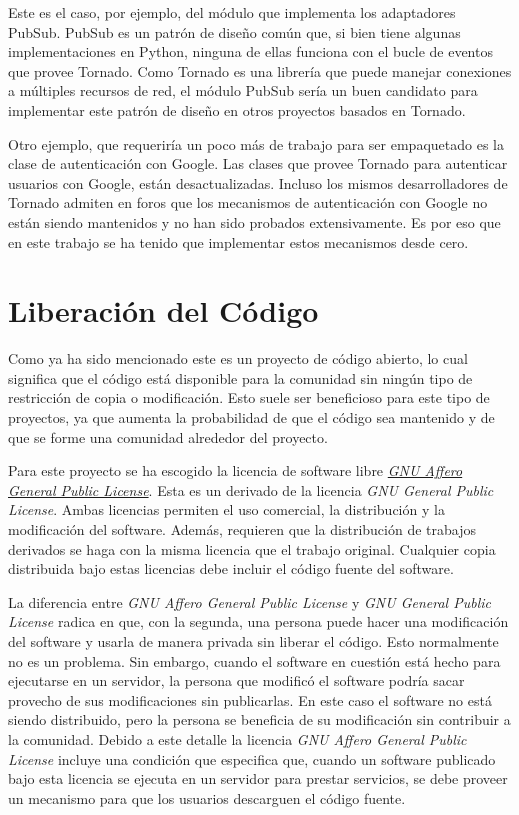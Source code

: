 Este es el caso, por ejemplo, del módulo que implementa los adaptadores
PubSub. PubSub es un patrón de diseño común que, si bien tiene algunas
implementaciones en Python, ninguna de ellas funciona con el bucle de
eventos que provee Tornado. Como Tornado es una librería que puede
manejar conexiones a múltiples recursos de red, el módulo PubSub sería
un buen candidato para implementar este patrón de diseño en otros
proyectos basados en Tornado.

Otro ejemplo, que requeriría un poco más de trabajo para ser empaquetado
es la clase de autenticación con Google. Las clases que provee Tornado
para autenticar usuarios con Google, están desactualizadas. Incluso los
mismos desarrolladores de Tornado admiten en foros que los mecanismos de
autenticación con Google no están siendo mantenidos y no han sido
probados extensivamente. Es por eso que en este trabajo se ha tenido que
implementar estos mecanismos desde cero.

\section{Liberación del Código}\label{liberaciuxf3n-del-cuxf3digo}

Como ya ha sido mencionado este es un proyecto de código abierto, lo
cual significa que el código está disponible para la comunidad sin
ningún tipo de restricción de copia o modificación. Esto suele ser
beneficioso para este tipo de proyectos, ya que aumenta la probabilidad
de que el código sea mantenido y de que se forme una comunidad alrededor
del proyecto.

Para este proyecto se ha escogido la licencia de software libre
\href{http://www.gnu.org/licenses/agpl-3.0.html}{\emph{GNU Affero
General Public License}}. Esta es un derivado de la licencia \emph{GNU
General Public License}. Ambas licencias permiten el uso comercial, la
distribución y la modificación del software. Además, requieren que la
distribución de trabajos derivados se haga con la misma licencia que el
trabajo original. Cualquier copia distribuida bajo estas licencias debe
incluir el código fuente del software.

La diferencia entre \emph{GNU Affero General Public License} y \emph{GNU
General Public License} radica en que, con la segunda, una persona puede
hacer una modificación del software y usarla de manera privada sin
liberar el código. Esto normalmente no es un problema. Sin embargo,
cuando el software en cuestión está hecho para ejecutarse en un
\gls{servidor}, la persona que modificó el software podría sacar
provecho de sus modificaciones sin publicarlas. En este caso el software
no está siendo distribuido, pero la persona se beneficia de su
modificación sin contribuir a la comunidad. Debido a este detalle la
licencia \emph{GNU Affero General Public License} incluye una condición
que especifica que, cuando un software publicado bajo esta licencia se
ejecuta en un \gls{servidor} para prestar servicios, se debe proveer un
mecanismo para que los usuarios descarguen el código fuente.
